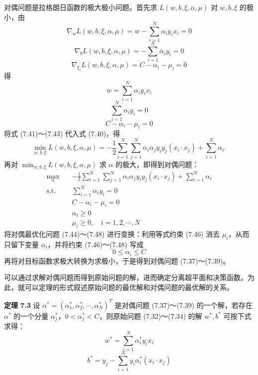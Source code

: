 \documentclass[UTF8,12pt,a4paper,fontset=fandol]{ctexart}
\begin{document}
对偶问题是拉格朗日函数的极大极小问题。首先求 $L(w,b,\xi,\alpha,\mu)$ 对 $w,b,\xi$ 的极小，由
\[
\nabla_w L(w,b,\xi,\alpha,\mu)=w-\sum_{i=1}^N\alpha_i y_i x_i=0
\]
\[
\nabla_b L(w,b,\xi,\alpha,\mu)=-\sum_{i=1}^N\alpha_i y_i=0
\]
\[
\nabla_{\xi_i} L(w,b,\xi,\alpha,\mu)=C-\alpha_i-\mu_i=0
\]
得
\begin{equation}
w=\sum_{i=1}^N\alpha_i y_i x_i
\tag{7.41}
\end{equation}
\begin{equation}
\sum_{i=1}^N\alpha_i y_i=0
\tag{7.42}
\end{equation}
\begin{equation}
C-\alpha_i-\mu_i=0
\tag{7.43}
\end{equation}
将式 (7.41)～(7.43) 代入式 (7.40)，得
\[
\min_{w,b,\xi}L(w,b,\xi,\alpha,\mu)
=-\frac{1}{2}\sum_{i=1}^N\sum_{j=1}^N\alpha_i\alpha_j y_i y_j(x_i\cdot x_j)+\sum_{i=1}^N\alpha_i.
\]
再对 $\min_{w,b,\xi}L(w,b,\xi,\alpha,\mu)$ 求 $\alpha$ 的极大，即得到对偶问题：
\begin{equation}
\begin{aligned}
\max_\alpha\quad & -\frac{1}{2}\sum_{i=1}^N\sum_{j=1}^N\alpha_i\alpha_j y_i y_j(x_i\cdot x_j)+\sum_{i=1}^N\alpha_i\\
\mathrm{s.t.}\quad & \sum_{i=1}^N\alpha_i y_i=0\\
& C-\alpha_i-\mu_i=0\\
& \alpha_i\geq 0\\
& \mu_i\geq 0,\quad i=1,2,\cdots,N
\end{aligned}
\tag{7.44--7.48}
\end{equation}
将对偶最优化问题 (7.44)～(7.48) 进行变换：利用等式约束 (7.46) 消去 $\mu_i$，从而只留下变量 $\alpha_i$，并将约束 (7.46)～(7.48) 写成
\begin{equation}
0\leq \alpha_i\leq C
\tag{7.49}
\end{equation}
再将对目标函数求极大转换为求极小，于是得到对偶问题 (7.37)～(7.39)。

可以通过求解对偶问题而得到原始问题的解，进而确定分离超平面和决策函数。为此，就可以定理的形式叙述原始问题的最优解和对偶问题的最优解的关系。

\noindent\textbf{定理 7.3}\quad
设 $\alpha^*=(\alpha_1^*,\alpha_2^*,\cdots,\alpha_N^*)^T$ 是对偶问题 (7.37)～(7.39) 的一个解，若存在 $\alpha^*$ 的一个分量 $\alpha_j^*$，$0<\alpha_j^*<C$，则原始问题 (7.32)～(7.34) 的解 $w^*,b^*$ 可按下式求得：
\begin{equation}
w^*=\sum_{i=1}^N\alpha_i^*y_i x_i
\tag{7.50}
\end{equation}
\begin{equation}
b^*=y_j-\sum_{i=1}^N y_i\alpha_i^*(x_i\cdot x_j)
\tag{7.51}
\end{equation}
\end{document}
